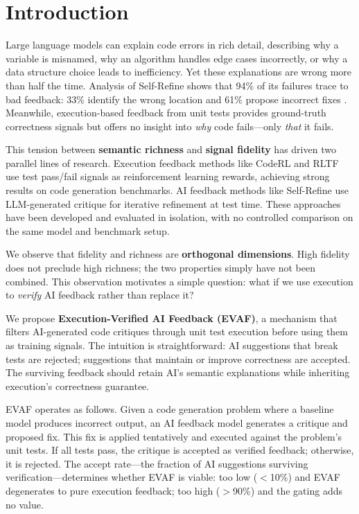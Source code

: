 \section{Introduction}

Large language models can explain code errors in rich detail, describing why a variable is misnamed, why an algorithm handles edge cases incorrectly, or why a data structure choice leads to inefficiency. Yet these explanations are wrong more than half the time. Analysis of Self-Refine shows that 94\% of its failures trace to bad feedback: 33\% identify the wrong location and 61\% propose incorrect fixes \citep{madaan2023selfrefine}. Meanwhile, execution-based feedback from unit tests provides ground-truth correctness signals but offers no insight into \emph{why} code fails---only \emph{that} it fails.

This tension between \textbf{semantic richness} and \textbf{signal fidelity} has driven two parallel lines of research. Execution feedback methods like CodeRL \citep{le2022coderl} and RLTF \citep{liu2023rltf} use test pass/fail signals as reinforcement learning rewards, achieving strong results on code generation benchmarks. AI feedback methods like Self-Refine use LLM-generated critique for iterative refinement at test time. These approaches have been developed and evaluated in isolation, with no controlled comparison on the same model and benchmark setup.

We observe that fidelity and richness are \textbf{orthogonal dimensions}. High fidelity does not preclude high richness; the two properties simply have not been combined. This observation motivates a simple question: what if we use execution to \emph{verify} AI feedback rather than replace it?

We propose \textbf{Execution-Verified AI Feedback (EVAF)}, a mechanism that filters AI-generated code critiques through unit test execution before using them as training signals. The intuition is straightforward: AI suggestions that break tests are rejected; suggestions that maintain or improve correctness are accepted. The surviving feedback should retain AI's semantic explanations while inheriting execution's correctness guarantee.

EVAF operates as follows. Given a code generation problem where a baseline model produces incorrect output, an AI feedback model generates a critique and proposed fix. This fix is applied tentatively and executed against the problem's unit tests. If all tests pass, the critique is accepted as verified feedback; otherwise, it is rejected. The accept rate---the fraction of AI suggestions surviving verification---determines whether EVAF is viable: too low ($<$10\%) and EVAF degenerates to pure execution feedback; too high ($>$90\%) and the gating adds no value.

